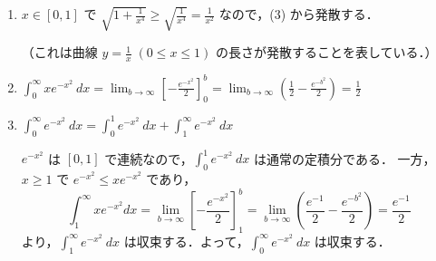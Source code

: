 \documentclass[a4paper,10pt, uplatex, dvipdfmx]{jsarticle}
\newcommand{\ds}{\displaystyle}
\begin{document}
\begin{enumerate}[(1)]
\item $x \in [0,1]$ で
  $\ds \sqrt{1+\frac{1}{x^4}} \geq \sqrt{\frac{1}{x^4}} =
  \frac{1}{x^2}$ なので，(3) から発散する．

  （これは曲線 $y=\frac{1}{x} \; (0 \leq x \leq 1)$ の長さが発散することを表している．）

\item $\ds \int_{0}^{\infty} x e^{-x^2}\ dx = \lim_{b \to \infty} \left[ -\frac{e^{-x^2}}{2}\right]_{0}^{b}
  = \lim_{b \to \infty}\left( \frac{1}{2} -\frac{e^{-b^2}}{2}\right) = \frac{1}{2}$

\item $\ds \int_{0}^{\infty} e^{-x^2}\ dx = \int_{0}^{1}e^{-x^2}\ dx + \int_{1}^{\infty} e^{-x^2} \ dx$

  $e^{-x^2}$ は $[0,1]$ で連続なので，$\ds \int_{0}^{1}e^{-x^2} \ dx$ は通常の定積分である．
  一方，$x \geq 1$ で $e^{-x^2} \leq xe^{-x^2}$ であり，
  \[
    \int_{1}^{\infty}x e^{-x^2}dx = \lim_{b \to \infty} \left[ -\frac{e^{-x^2}}{2}\right]_{1}^{b}
    =\lim_{b \to \infty}\left( \frac{e^{-1}}{2} - \frac{e^{-b^2}}{2} \right) = \frac{e^{-1}}{2}
  \]
  より，$\ds \int_{1}^{\infty} e^{-x^2} \ dx$
  は収束する．よって，$\ds \int_{0}^{\infty}e^{-x^2}\ dx$ は収束する．
\end{enumerate}
\end{document}
